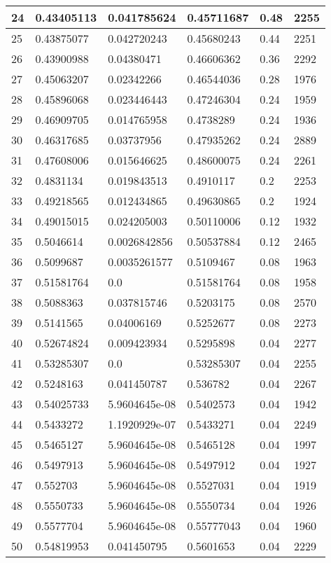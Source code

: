 \begin{longtable}{|l|l|l|l|l|l|}
24 & 0.43405113 & 0.041785624 & 0.45711687 & 0.48 & 2255 \\ \hline 
25 & 0.43875077 & 0.042720243 & 0.45680243 & 0.44 & 2251 \\ \hline 
26 & 0.43900988 & 0.04380471 & 0.46606362 & 0.36 & 2292 \\ \hline 
27 & 0.45063207 & 0.02342266 & 0.46544036 & 0.28 & 1976 \\ \hline 
28 & 0.45896068 & 0.023446443 & 0.47246304 & 0.24 & 1959 \\ \hline 
29 & 0.46909705 & 0.014765958 & 0.4738289 & 0.24 & 1936 \\ \hline 
30 & 0.46317685 & 0.03737956 & 0.47935262 & 0.24 & 2889 \\ \hline 
31 & 0.47608006 & 0.015646625 & 0.48600075 & 0.24 & 2261 \\ \hline 
32 & 0.4831134 & 0.019843513 & 0.4910117 & 0.2 & 2253 \\ \hline 
33 & 0.49218565 & 0.012434865 & 0.49630865 & 0.2 & 1924 \\ \hline 
34 & 0.49015015 & 0.024205003 & 0.50110006 & 0.12 & 1932 \\ \hline 
35 & 0.5046614 & 0.0026842856 & 0.50537884 & 0.12 & 2465 \\ \hline 
36 & 0.5099687 & 0.0035261577 & 0.5109467 & 0.08 & 1963 \\ \hline 
37 & 0.51581764 & 0.0 & 0.51581764 & 0.08 & 1958 \\ \hline 
38 & 0.5088363 & 0.037815746 & 0.5203175 & 0.08 & 2570 \\ \hline 
39 & 0.5141565 & 0.04006169 & 0.5252677 & 0.08 & 2273 \\ \hline 
40 & 0.52674824 & 0.009423934 & 0.5295898 & 0.04 & 2277 \\ \hline 
41 & 0.53285307 & 0.0 & 0.53285307 & 0.04 & 2255 \\ \hline 
42 & 0.5248163 & 0.041450787 & 0.536782 & 0.04 & 2267 \\ \hline 
43 & 0.54025733 & 5.9604645e-08 & 0.5402573 & 0.04 & 1942 \\ \hline 
44 & 0.5433272 & 1.1920929e-07 & 0.5433271 & 0.04 & 2249 \\ \hline 
45 & 0.5465127 & 5.9604645e-08 & 0.5465128 & 0.04 & 1997 \\ \hline 
46 & 0.5497913 & 5.9604645e-08 & 0.5497912 & 0.04 & 1927 \\ \hline 
47 & 0.552703 & 5.9604645e-08 & 0.5527031 & 0.04 & 1919 \\ \hline 
48 & 0.5550733 & 5.9604645e-08 & 0.5550734 & 0.04 & 1926 \\ \hline 
49 & 0.5577704 & 5.9604645e-08 & 0.55777043 & 0.04 & 1960 \\ \hline 
50 & 0.54819953 & 0.041450795 & 0.5601653 & 0.04 & 2229 \\ \hline 
\end{longtable}
